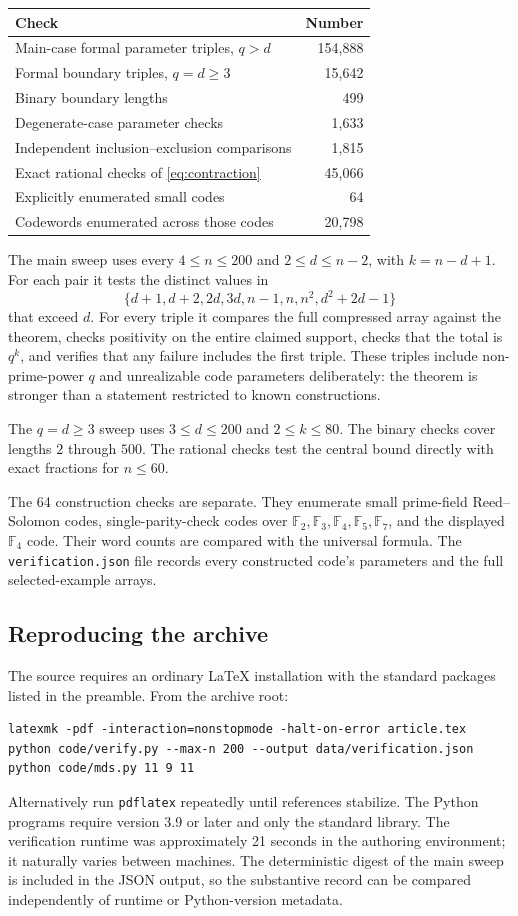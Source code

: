 \documentclass[11pt,letterpaper]{article}
\numberwithin{equation}{section}
\theoremstyle{definition}
\newcommand{\F}{\mathbb F}
\begin{document}
\begin{center}
\begin{tabular}{@{}lr@{}}
\toprule
Check & Number\\
\midrule
Main-case formal parameter triples, $q>d$ & 154,888\\
Formal boundary triples, $q=d\ge3$ & 15,642\\
Binary boundary lengths & 499\\
Degenerate-case parameter checks & 1,633\\
Independent inclusion--exclusion comparisons & 1,815\\
Exact rational checks of \eqref{eq:contraction} & 45,066\\
Explicitly enumerated small codes & 64\\
Codewords enumerated across those codes & 20,798\\
\bottomrule
\end{tabular}
\end{center}

The main sweep uses every $4\le n\le200$ and $2\le d\le n-2$,
with $k=n-d+1$. For each pair it tests the distinct values in
\[
 \{d+1,d+2,2d,3d,n-1,n,n^2,d^2+2d-1\}
\]
that exceed $d$. For every triple it compares the full compressed
array against the theorem, checks positivity on the entire claimed
support, checks that the total is $q^k$, and verifies that any failure
includes the first triple. These triples include non-prime-power
$q$ and unrealizable code parameters deliberately: the theorem is
stronger than a statement restricted to known constructions.

The $q=d\ge3$ sweep uses $3\le d\le200$ and $2\le k\le80$.
The binary checks cover lengths $2$ through $500$.
The rational checks test the central bound directly with exact
fractions for $n\le60$.

The 64 construction checks are separate. They enumerate small
prime-field Reed--Solomon codes, single-parity-check codes over
$\F_2,\F_3,\F_4,\F_5,\F_7$, and the displayed $\F_4$ code.
Their word counts are compared with the universal formula. The
\texttt{verification.json} file records every constructed code's
parameters and the full selected-example arrays.

\subsection{Reproducing the archive}
The source requires an ordinary \LaTeX{} installation with the
standard packages listed in the preamble. From the archive root:
\begin{lstlisting}
latexmk -pdf -interaction=nonstopmode -halt-on-error article.tex
python code/verify.py --max-n 200 --output data/verification.json
python code/mds.py 11 9 11
\end{lstlisting}
Alternatively run \texttt{pdflatex} repeatedly until references stabilize.
The Python programs require version 3.9 or later and only the standard
library. The verification runtime was approximately 21 seconds in
the authoring environment; it naturally varies between machines.
The deterministic digest of the main sweep is included in the JSON
output, so the substantive record can be compared independently of
runtime or Python-version metadata.
\end{document}
